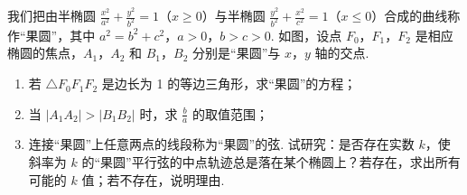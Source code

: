 \begin{problem}
我们把由半椭圆 \(\frac{x^2}{a^2} + \frac{y^2}{b^2} = 1\)（\(x \geqslant 0\)）与半椭圆 \(\frac{y^2}{b^2} + \frac{x^2}{c^2} = 1\)（\(x \leqslant 0\)）合成的曲线称作“果圆”，其中 \(a^2 = b^2 + c^2\)，\(a > 0\)，\(b > c > 0\). 如图，设点 \(F_0\)，\(F_1\)，\(F_2\) 是相应椭圆的焦点，\(A_1\)，\(A_2\) 和 \(B_1\)，\(B_2\) 分别是“果圆”与 \(x\)，\(y\) 轴的交点.

\begin{enumerate}
\item 若 \(\triangle F_0F_1F_2\) 是边长为 1 的等边三角形，求“果圆”的方程；
\item 当 \(\left|A_1A_2\right| > \left|B_1B_2\right|\) 时，求 \(\frac{b}{a}\) 的取值范围；
\item 连接“果圆”上任意两点的线段称为“果圆”的弦. 试研究：是否存在实数 \(k\)，使斜率为 \(k\) 的“果圆”平行弦的中点轨迹总是落在某个椭圆上？若存在，求出所有可能的 \(k\) 值；若不存在，说明理由.
\end{enumerate}

\end{problem}
\FloatBarrier

